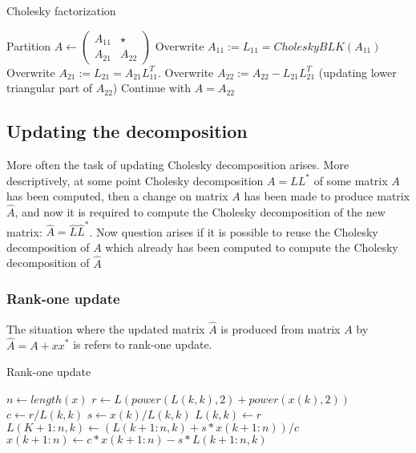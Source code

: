 \begin{algorithm}[h]
  \caption{Cholesky factorization}\label{cholesky_blk}
  \begin{algorithmic}[1]
     \State Partition $A \gets
	\left(
\begin{array}{c|c}
A_{11}  & \star \\ \hline
A_{21} & A_{22}
\end{array}
\right)$
	\State Overwrite $A_{11}:=L_{11} = CholeskyBLK({A_{11}})$
	\State Overwrite $A_{21} :=L_21 = A_{21}L_{11}^T$.
	\State Overwrite $A_{22}:=A_{22}-L_{21}L_{21}^T$ (updating lower triangular part of $A_22$)
	\State Continue with $A=A_{22}$
    \EndProcedure
  \end{algorithmic}
\end{algorithm}

\subsection*{Updating the decomposition}
More often the task of updating Cholesky decomposition arises. More descriptively, at some point Cholesky decomposition $A=LL^*$ of some matrix $A$ has been computed, then a change on matrix $A$ has been made to produce matrix $\hat{A}$, and now it is required to compute the Cholesky decomposition of the new matrix: $\hat{A}=\hat{L}\hat{L}^*$. Now question arises if it is possible to reuse the Cholesky decomposition of $A$ which already has been computed to compute the Cholesky decomposition of $\hat{A}$
\subsubsection*{Rank-one update}
The situation where the updated matrix $\hat{A}$ is produced from matrix $A$ by $\hat{A}=A+xx^*$ is refers to rank-one update. 
\begin{algorithm}[h]
  \caption{Rank-one update}\label{cholesky_rank_update}
  \begin{algorithmic}[1]
     \State $n\gets length(x)$
     	\State $r\gets L(power(L(k,k),2)+power(x(k),2))$
     	\State $c\gets r/L(k,k)$
     	\State $s\gets x(k)/L(k,k)$
     	\State $L(k,k)\gets r$
     	\State $L(K+1:n,k)\gets (L(k+1:n,k)+s*x(k+1:n))/c$
     	\State $x(k+1:n) \gets c*x(k+1:n) - s*L(k+1:n,k)$
     \EndFor    
    \EndProcedure
  \end{algorithmic}
\end{algorithm}

